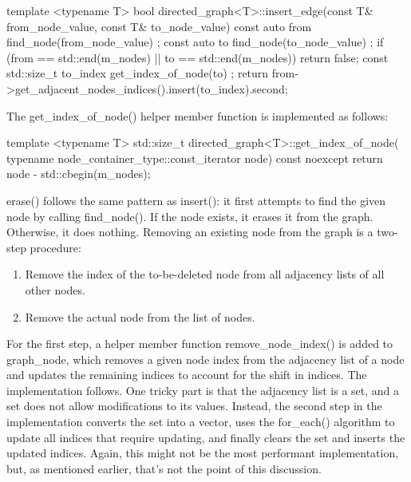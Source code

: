 \begin{cpp}
template <typename T>
bool directed_graph<T>::insert_edge(const T& from_node_value,
    const T& to_node_value)
{
    const auto from { find_node(from_node_value) };
    const auto to { find_node(to_node_value) };
    if (from == std::end(m_nodes) || to == std::end(m_nodes)) {
        return false;
    }
    const std::size_t to_index { get_index_of_node(to) };
    return from->get_adjacent_nodes_indices().insert(to_index).second;
}
\end{cpp}

The get\_index\_of\_node() helper member function is implemented as follows:

\begin{cpp}
template <typename T>
std::size_t directed_graph<T>::get_index_of_node(
    typename node_container_type::const_iterator node) const noexcept
{
    return node - std::cbegin(m_nodes);
}
\end{cpp}


erase() follows the same pattern as insert(): it first attempts to find the given node by calling find\_node(). If the node exists, it erases it from the graph. Otherwise, it does nothing. Removing an existing node from the graph is a two-step procedure:

\begin{enumerate}
\item
Remove the index of the to-be-deleted node from all adjacency lists of all other nodes.

\item
Remove the actual node from the list of nodes.
\end{enumerate}

For the first step, a helper member function remove\_node\_index() is added to graph\_node, which removes a given node index from the adjacency list of a node and updates the remaining indices to account for the shift in indices. The implementation follows. One tricky part is that the adjacency list is a set, and a set does not allow modifications to its values. Instead, the second step in the implementation converts the set into a vector, uses the for\_each() algorithm to update all indices that require updating, and finally clears the set and inserts the updated indices. Again, this might not be the most performant implementation, but, as mentioned earlier, that’s not the point of this discussion.

